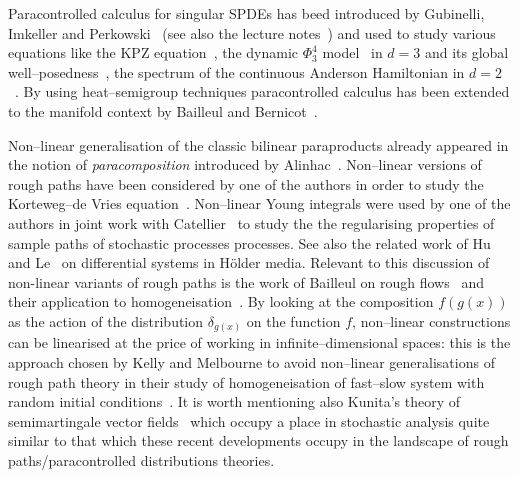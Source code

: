 \documentclass[11pt,reqno]{amsart}
\newcommand{\tmtextit}[1]{{\itshape{#1}}}
\begin{document}
Paracontrolled calculus for singular SPDEs has beed introduced by Gubinelli,
Imkeller and Perkowski~{\cite{gubinelli_paracontrolled_2015}} (see also the
lecture notes~{\cite{gubinelli_lectures_2015}}) and used to study various
equations like the KPZ equation~{\cite{gubinelli_kpz_2015}}, the dynamic
$\Phi^4_3$ model~{\cite{catellier_paracontrolled_2013}} in $d = 3$ and its
global well--posedness~{\cite{mourrat_global_2016}}, the spectrum of the
continuous Anderson Hamiltonian in $d = 2$~{\cite{allez_continuous_2015}}. By
using heat--semigroup techniques paracontrolled calculus has been extended to
the manifold context by Bailleul and Bernicot~{\cite{bailleul_heat_2015}}.

Non--linear generalisation of the classic bilinear paraproducts already
appeared in the notion of \tmtextit{paracomposition} introduced by
Alinhac~{\cite{bony_microlocal_1991}}. Non--linear versions of rough paths
have been considered by one of the authors in order to study the Korteweg--de
Vries equation~{\cite{gubinelli_rough_2012}}. Non--linear Young integrals were
used by one of the authors in joint work with
Catellier~{\cite{catellier_averaging_2016}} to study the the regularising
properties of sample paths of stochastic processes processes. See also the
related work of Hu and Le~{\cite{hu_nonlinear_2014}} on differential systems
in H{\"o}lder media. Relevant to this discussion of non-linear variants of
rough paths is the work of Bailleul on rough
flows~{\cite{bailleul_flows_2015}} and their application to
homogeneisation~{\cite{bailleul_rough_2016}}. By looking at the composition $f
(g (x))$ as the action of the distribution $\delta_{g (x)}$ on the function
$f$, non--linear constructions can be linearised at the price of working in
infinite--dimensional spaces: this is the approach chosen by Kelly and
Melbourne to avoid non--linear generalisations of rough path theory in their
study of homogeneisation of fast--slow system with random initial
conditions~{\cite{kelly_deterministic_2014}}. It is worth mentioning also
Kunita's theory of semimartingale vector
fields~{\cite{kunita_stochastic_1984}} which occupy a place in stochastic
analysis quite similar to that which these recent developments occupy in the
landscape of rough paths/paracontrolled distributions theories.
\end{document}
